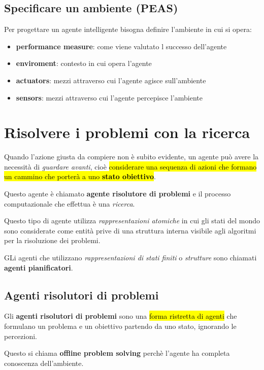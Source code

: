 \documentclass[12pt, a4paper, oneside]{book}
\begin{document}
    \section{Specificare un ambiente (PEAS)}
    Per progettare un agente intelligente bisogna definire l'ambiente in cui si opera:
    \begin{itemize}
      \item \textbf{performance measure}: come viene valutato l successo dell'agente
      \item \textbf{enviroment}: contesto in cui opera l'agente
      \item \textbf{actuators}: mezzi attraverso cui l'agente agisce sull'ambiente
      \item \textbf{sensors}: mezzi attraverso cui l'agente percepisce l'ambiente
    \end{itemize}



    \chapter{Risolvere i problemi con la ricerca}
    Quando l'azione giusta da compiere non è subito evidente, un agente può avere la necessità di \textit{guardare avanti}, cioè \hl{considerare una sequenza di azioni che formano un cammino che porterà a uno \textbf{stato obiettivo}}.

    Questo agente è chiamato \textcolor{azzurrino}{\textbf{agente risolutore di problemi}} e il processo computazionale che effettua è una \textit{ricerca}.

    Questo tipo di agente utilizza \textit{rappresentazioni atomiche} in cui gli stati del mondo sono considerate come entità prive di una struttura interna visibile agli algoritmi per la risoluzione dei problemi.

    GLi agenti che utilizzano \textit{rappresentazioni di stati finiti} o \textit{strutture} sono chiamati \textbf{agenti pianificatori}.

    \section{Agenti risolutori di problemi}
    Gli \textbf{agenti risolutori di problemi} sono una \hl{forma ristretta di agenti} che formulano un problema e un obiettivo partendo da uno stato, ignorando le percezioni.

    Questo si chiama \textcolor{azzurrino}{\textbf{offline problem solving}} perchè l'agente ha completa conoscenza dell'ambiente.
\end{document}
